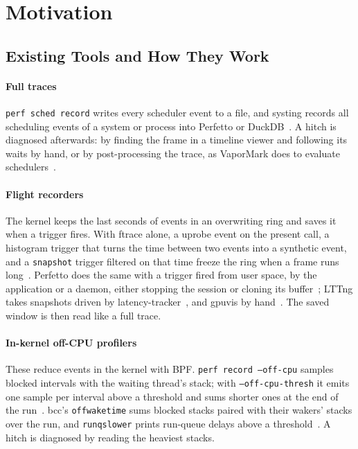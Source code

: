 \section{Motivation}
\label{sec:motivation}

\subsection{Existing Tools and How They Work}
\label{sec:tools}

\paragraph{Full traces} \texttt{perf sched record} writes every scheduler
event to a file, and systing records all scheduling events of a system or
process into Perfetto or DuckDB~\cite{systing}. A hitch is diagnosed
afterwards: by finding the frame in a timeline viewer and following its
waits by hand, or by post-processing the trace, as VaporMark does to
evaluate schedulers~\cite{vapormark}.

\paragraph{Flight recorders} The kernel keeps the last seconds of events in
an overwriting ring and saves it when a trigger fires. With ftrace alone,
a uprobe event on the present call, a histogram trigger that turns the time
between two events into a synthetic event, and a \texttt{snapshot} trigger
filtered on that time freeze the ring when a frame runs
long~\cite{ftracehist}. Perfetto does the same with a trigger fired from
user space, by the application or a daemon, either stopping the session or
cloning its buffer~\cite{perfetto-triggers}; LTTng takes snapshots driven by
latency-tracker~\cite{desfossez2016latency}, and gpuvis by
hand~\cite{gpuvis}. The saved window is then read like a full trace.

\paragraph{In-kernel off-CPU profilers} These reduce events in the kernel
with BPF. \texttt{perf record --off-cpu} samples blocked intervals with the
waiting thread's stack; with \texttt{--off-cpu-thresh} it emits one sample
per interval above a threshold and sums shorter ones at the end of the
run~\cite{perf-offcpu-thresh}. bcc's \texttt{offwaketime} sums blocked
stacks paired with their wakers' stacks over the run, and
\texttt{runqslower} prints run-queue delays above a
threshold~\cite{gregg2019bpf}. A hitch is diagnosed by reading the
heaviest stacks.

